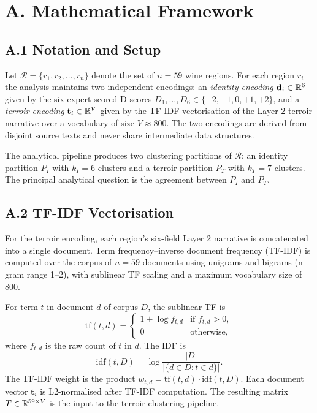 \documentclass[11pt]{article}
\begin{document}

\section*{A. Mathematical Framework}

\subsection*{A.1 Notation and Setup}
Let $\mathcal{R} = \{r_1, r_2, \ldots, r_n\}$ denote the set of $n = 59$ wine regions. For each region $r_i$ the analysis maintains two independent encodings: an \emph{identity encoding} $\mathbf{d}_i \in \mathbb{R}^{6}$ given by the six expert-scored D-scores $D_1, \ldots, D_6 \in \{-2, -1, 0, +1, +2\}$, and a \emph{terroir encoding} $\mathbf{t}_i \in \mathbb{R}^{V}$ given by the TF-IDF vectorisation of the Layer 2 terroir narrative over a vocabulary of size $V \approx 800$. The two encodings are derived from disjoint source texts and never share intermediate data structures.

The analytical pipeline produces two clustering partitions of $\mathcal{R}$: an identity partition $P_I$ with $k_I = 6$ clusters and a terroir partition $P_T$ with $k_T = 7$ clusters. The principal analytical question is the agreement between $P_I$ and $P_T$.

\subsection*{A.2 TF-IDF Vectorisation}
For the terroir encoding, each region's six-field Layer 2 narrative is concatenated into a single document. Term frequency--inverse document frequency (TF-IDF) is computed over the corpus of $n = 59$ documents using unigrams and bigrams (n-gram range 1--2), with sublinear TF scaling and a maximum vocabulary size of 800.

For term $t$ in document $d$ of corpus $D$, the sublinear TF is
\[
\mathrm{tf}(t, d) = \begin{cases} 1 + \log f_{t,d} & \text{if } f_{t,d} > 0, \\ 0 & \text{otherwise}, \end{cases}
\]
where $f_{t,d}$ is the raw count of $t$ in $d$. The IDF is
\[
\mathrm{idf}(t, D) = \log \frac{|D|}{|\{d \in D : t \in d\}|}.
\]
The TF-IDF weight is the product $w_{t,d} = \mathrm{tf}(t, d) \cdot \mathrm{idf}(t, D)$. Each document vector $\mathbf{t}_i$ is L2-normalised after TF-IDF computation. The resulting matrix $T \in \mathbb{R}^{59 \times V}$ is the input to the terroir clustering pipeline.
\end{document}
